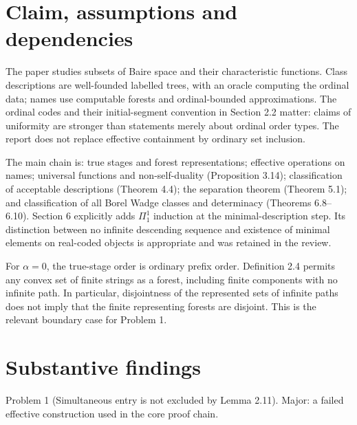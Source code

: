 \documentclass[10pt]{article}
\begin{document}
\section*{Claim, assumptions and dependencies}
The paper studies subsets of Baire space and their characteristic functions. Class descriptions are well-founded labelled trees, with an oracle computing the ordinal data; names use computable forests and ordinal-bounded approximations. The ordinal codes and their initial-segment convention in Section 2.2 matter: claims of uniformity are stronger than statements merely about ordinal order types. The report does not replace effective containment by ordinary set inclusion.\par
The main chain is: true stages and forest representations; effective operations on names; universal functions and non-self-duality (Proposition 3.14); classification of acceptable descriptions (Theorem 4.4); the separation theorem (Theorem 5.1); and classification of all Borel Wadge classes and determinacy (Theorems 6.8–6.10). Section 6 explicitly adds \(\Pi^1_1\) induction at the minimal-description step. Its distinction between no infinite descending sequence and existence of minimal elements on real-coded objects is appropriate and was retained in the review.\par
For \(\alpha=0\), the true-stage order is ordinary prefix order. Definition 2.4 permits any convex set of finite strings as a forest, including finite components with no infinite path. In particular, disjointness of the represented sets of infinite paths does not imply that the finite representing forests are disjoint. This is the relevant boundary case for Problem 1.\par
\section*{Substantive findings}
Problem 1 (Simultaneous entry is not excluded by Lemma 2.11).  Major: a failed effective construction used in the core proof chain.\par
\end{document}
